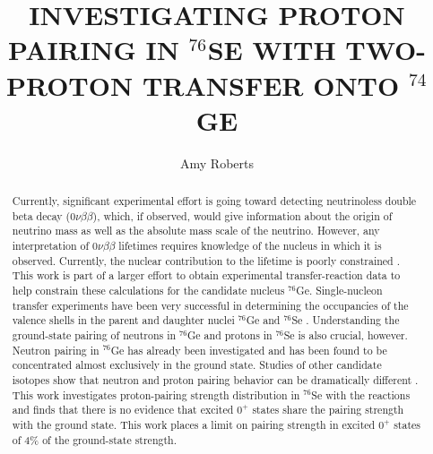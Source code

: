 \documentclass[textrefs,final,noinfo,12pt]{nddiss2e}
\newcommand{\Ge}[1]{$^{#1}$Ge\xspace}
\newcommand{\Se}[1]{$^{#1}$Se\xspace}
\newcommand{\zvbb}{$0\nu\beta\beta$\xspace}
\newcommand{\zp}{$0^+$\xspace}
\begin{document}
\frontmatter

\title{INVESTIGATING PROTON PAIRING IN $^{76}$SE WITH TWO-PROTON TRANSFER ONTO $^{74}$GE}
\author{Amy Roberts}

\maketitle
%
%

\makecopyright

\begin{abstract}
Currently, significant experimental effort is going toward detecting neutrinoless double beta decay (\zvbb), which, if observed, would give information about the origin of neutrino mass as well as the absolute mass scale of the neutrino.  However, any interpretation of \zvbb lifetimes requires knowledge of the nucleus in which it is observed.  Currently, the nuclear contribution to the lifetime is poorly constrained \citep{zvbbSchwingenheuer}.  This work is part of a larger effort to obtain experimental transfer-reaction data to help constrain these calculations for the candidate nucleus \Ge{76}.  Single-nucleon transfer experiments have been very successful in determining the occupancies of the valence shells in the parent and daughter nuclei \Ge{76} and \Se{76} \citep{valenceProtons,valenceNeutrons}.  Understanding the ground-state pairing of neutrons in \Ge{76} and protons in \Se{76} is also crucial, however.  Neutron pairing in \Ge{76} has already been investigated \cite{neutronPairsGermanium} and has been found to be concentrated almost exclusively in the ground state.  Studies of other candidate isotopes show that neutron and proton pairing behavior can be dramatically different \cite{protonPairsTellurium,neutronPairsTellurium}.  This work investigates proton-pairing strength distribution in \Se{76} with the reactions \reactions and finds that there is no evidence that excited \zp states share the pairing strength with the ground state.  This work places a limit on pairing strength in excited \zp states of 4\% of the ground-state strength. 

\end{abstract}
\end{document}
